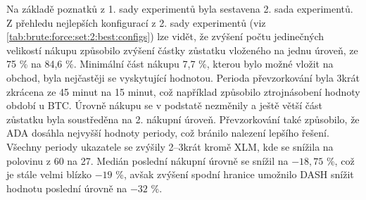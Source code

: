 Na základě poznatků z 1. sady experimentů byla sestavena 2. sada experimentů.
Z přehledu nejlepších konfigurací z 2. sady experimentů (viz \ref{tab:brute:force:set:2:best:configs}) lze vidět, že zvýšení počtu jedinečných velikostí nákupu způsobilo zvýšení částky zůstatku vloženého na jednu úroveň, ze 75 \% na 84,6 \%.
Minimální část nákupu 7,7 \%, kterou bylo možné vložit na obchod, byla nejčastěji se vyskytující hodnotou.
Perioda převzorkování byla 3krát zkrácena ze 45 minut na 15 minut, což například způsobilo ztrojnásobení hodnoty období u BTC.
Úrovně nákupu se v podstatě nezměnily a ještě větší část zůstatku byla soustředěna na 2. nákupní úroveň.
Převzorkování také způsobilo, že ADA dosáhla nejvyšší hodnoty periody, což bránilo nalezení lepšího řešení.
Všechny periody ukazatele se zvýšily 2--3krát kromě XLM, kde se snížila na polovinu z 60 na 27.
Medián poslední nákupní úrovně se snížil na \(-18,75\) \%, což je stále velmi blízko \(-19\) \%, avšak zvýšení spodní hranice umožnilo DASH snížit hodnotu poslední úrovně na \(-32\) \%.

